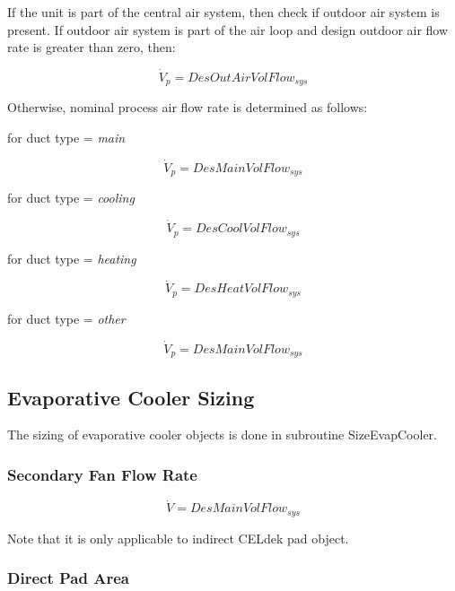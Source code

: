 If the unit is part of the central air system, then check if outdoor air system is present. If outdoor air system is part of the air loop and design outdoor air flow rate is greater than zero, then:

\begin{equation}
{\dot V_p} = DesOutAirVolFlo{w_{sys}}
\end{equation}

Otherwise, nominal process air flow rate is determined as follows:

for duct type = \emph{main}

\begin{equation}
{\dot V_p} = DesMainVolFlo{w_{sys}}
\end{equation}

for duct type = \emph{cooling}

\begin{equation}
{\dot V_p} = DesCoolVolFlo{w_{sys}}
\end{equation}

for duct type = \emph{heating}

\begin{equation}
{\dot V_p} = DesHeatVolFlo{w_{sys}}
\end{equation}

for duct type = \emph{other}

\begin{equation}
{\dot V_p} = DesMainVolFlo{w_{sys}}
\end{equation}

\subsection{Evaporative Cooler Sizing}\label{evaporative-cooler-sizing}

The sizing of evaporative cooler objects is done in subroutine SizeEvapCooler.

\subsubsection{Secondary Fan Flow Rate}\label{secondary-fan-flow-rate-1}

\begin{equation}
\dot V = DesMainVolFlo{w_{sys}}
\end{equation}

Note that it is only applicable to indirect CELdek pad object.

\subsubsection{Direct Pad Area}\label{direct-pad-area}

